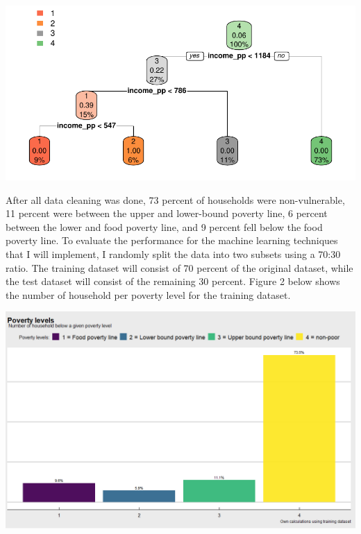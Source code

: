 \documentclass[11pt,preprint, authoryear]{elsarticle}
\let\origfigure\figure
\let\endorigfigure\endfigure
\renewenvironment{figure}[1][2] {
    \expandafter\origfigure\expandafter[H]
} {
    \endorigfigure
}
\numberwithin{equation}{section}
\numberwithin{figure}{section}
\numberwithin{table}{section}
\begin{document}
\begin{figure}[H]

{\centering \includegraphics{Predicting-Poverty_files/figure-latex/Figure1-1} 

}

\caption{Decision tree for poverty levels \label{Figure1}}\label{fig:Figure1}
\end{figure}

After all data cleaning was done, 73 percent of households were
non-vulnerable, 11 percent were between the upper and lower-bound
poverty line, 6 percent between the lower and food poverty line, and 9
percent fell below the food poverty line. To evaluate the performance
for the machine learning techniques that I will implement, I randomly
split the data into two subsets using a 70:30 ratio. The training
dataset will consist of 70 percent of the original dataset, while the
test dataset will consist of the remaining 30 percent. Figure 2 below
shows the number of household per poverty level for the training
dataset.

\begin{figure}
\centerline{\includegraphics[scale=0.65]{plot1.png}}
\caption{Number of household per poverty level}
\end{figure}
\end{document}
